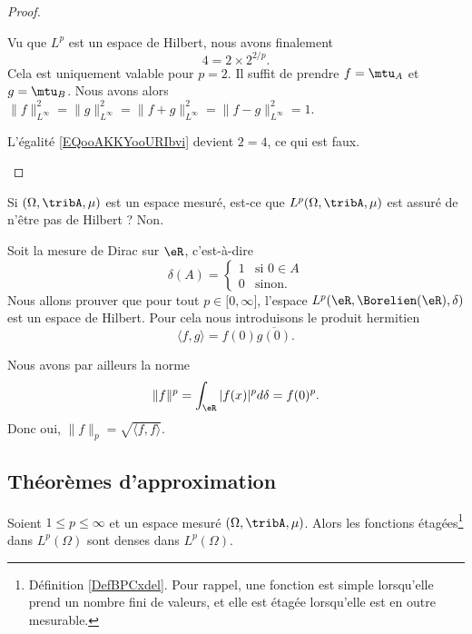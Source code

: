 \begin{proof}
\begin{subproof}
		Vu que \( L^p\) est un espace de Hilbert, nous avons finalement
		\begin{equation}
			4=2\times 2^{2/p}.
		\end{equation}
		Cela est uniquement valable pour \( p=2\).
		\spitem[Pour \( p=\infty\)]
		Il suffit de prendre \( f=\mtu_A\) et \( g=\mtu_B\). Nous avons alors \(  \| f \|_{L^{\infty}}^2= \| g \|_{L^{\infty}}^2  =  \| f+g \|_{L^{\infty}}^2=\| f-g \|_{L^{\infty}}^2=1\).

		L'égalité \eqref{EQooAKKYooURIbvi} devient \( 2=4\), ce qui est faux.
	\end{subproof}
\end{proof}

Si \( (\Omega,\tribA,\mu)\) est un espace mesuré, est-ce que \( L^p(\Omega,\tribA,\mu)\) est assuré de n'être pas de Hilbert ? Non.

\begin{example}
	Soit la mesure de Dirac sur \( \eR\), c'est-à-dire
	\begin{equation}
		\delta(A)=\begin{cases}
			1 & \text{si } 0\in A \\
			0 & \text{sinon. }
		\end{cases}
	\end{equation}
	Nous allons prouver que pour tout \( p\in \mathopen[ 0 , \infty \mathclose]\), l'espace \( L^p(\eR,\Borelien(\eR),\delta)\) est un espace de Hilbert. Pour cela nous introduisons le produit hermitien
	\begin{equation}
		\langle f, g\rangle =f(0)\overline{ g(0) }.
	\end{equation}

	Nous avons par ailleurs la norme
	\begin{equation}
		\| f \|^p=\int_{\eR}| f(x) |^pd\delta=f(0)^p.
	\end{equation}
	Donc oui, \( \| f \|_p=\sqrt{ \langle f, f\rangle  }\).
\end{example}

\subsection{Théorèmes d'approximation}

\begin{proposition}      \label{PROPooUQUBooAWgNhm}
	Soient \( 1\leq p\leq\infty\) et un espace mesuré \( (\Omega,\tribA,\mu)\). Alors les fonctions étagées\footnote{Définition \ref{DefBPCxdel}. Pour rappel, une fonction est simple lorsqu'elle prend un nombre fini de valeurs, et elle est étagée lorsqu'elle est en outre mesurable.} dans \( L^p(\Omega)\) sont denses dans \( L^p(\Omega)\).
\end{proposition}

